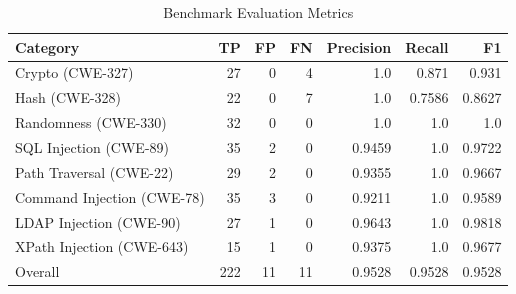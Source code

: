 \begin{table}[h]
\centering
\begin{tabular}{lrrrrrr}
\hline
Category & TP & FP & FN & Precision & Recall & F1 \\
\hline
Crypto (CWE-327) & 27 & 0 & 4 & 1.0 & 0.871 & 0.931 \\
Hash (CWE-328) & 22 & 0 & 7 & 1.0 & 0.7586 & 0.8627 \\
Randomness (CWE-330) & 32 & 0 & 0 & 1.0 & 1.0 & 1.0 \\
SQL Injection (CWE-89) & 35 & 2 & 0 & 0.9459 & 1.0 & 0.9722 \\
Path Traversal (CWE-22) & 29 & 2 & 0 & 0.9355 & 1.0 & 0.9667 \\
Command Injection (CWE-78) & 35 & 3 & 0 & 0.9211 & 1.0 & 0.9589 \\
LDAP Injection (CWE-90) & 27 & 1 & 0 & 0.9643 & 1.0 & 0.9818 \\
XPath Injection (CWE-643) & 15 & 1 & 0 & 0.9375 & 1.0 & 0.9677 \\
Overall & 222 & 11 & 11 & 0.9528 & 0.9528 & 0.9528 \\
\hline
\end{tabular}
\caption{Benchmark Evaluation Metrics}
\end{table}
